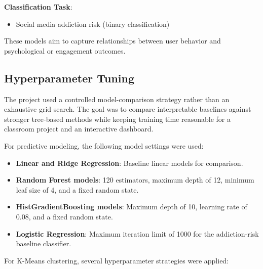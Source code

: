 \documentclass[12pt,a4paper]{article}
\begin{document}
\textbf{Classification Task}:
\begin{itemize}
    \item Social media addiction risk (binary classification)
\end{itemize}

These models aim to capture relationships between user behavior and psychological or engagement outcomes.

\subsection{Hyperparameter Tuning}
The project used a controlled model-comparison strategy rather than an exhaustive grid search. The goal was to compare interpretable baselines against stronger tree-based methods while keeping training time reasonable for a classroom project and an interactive dashboard.

For predictive modeling, the following model settings were used:

\begin{itemize}
    \item \textbf{Linear and Ridge Regression}: Baseline linear models for comparison.
    \item \textbf{Random Forest models}: 120 estimators, maximum depth of 12, minimum leaf size of 4, and a fixed random state.
    \item \textbf{HistGradientBoosting models}: Maximum depth of 10, learning rate of 0.08, and a fixed random state.
    \item \textbf{Logistic Regression}: Maximum iteration limit of 1000 for the addiction-risk baseline classifier.
\end{itemize}

For K-Means clustering, several hyperparameter strategies were applied:
\end{document}
